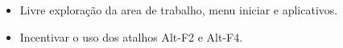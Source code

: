 \begin{itemize}
	\item Livre exploração da area de trabalho, menu iniciar e aplicativos.
	\item Incentivar o uso dos atalhos Alt-F2 e Alt-F4.
\end{itemize}


